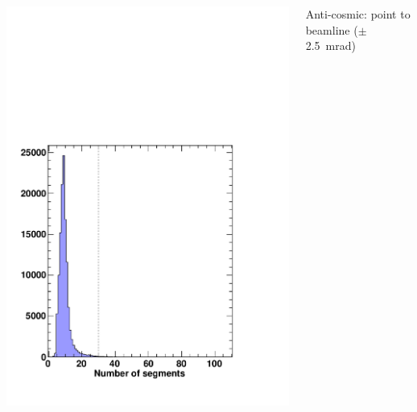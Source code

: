 \documentclass[compress]{beamer}
\begin{document}
\begin{frame}
\begin{columns}
\includegraphics[width=\linewidth]{MCBeamHalo_num_segments.pdf}

Anti-cosmic: point to beamline ($\pm$2.5~mrad)


\end{columns}
\end{frame}
\end{document}
